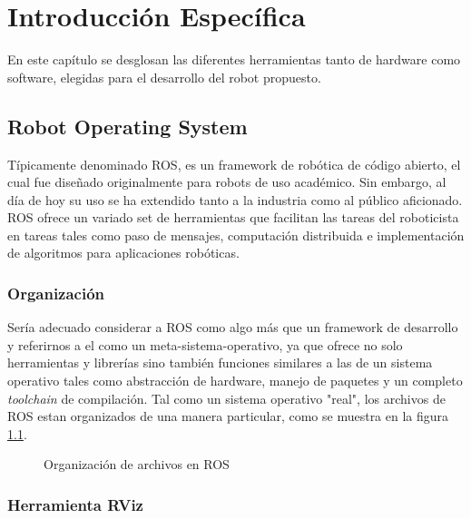 \chapter{Introducción Específica}

\label{Capitulo2}

En este capítulo se desglosan las diferentes herramientas tanto de hardware como software, elegidas para el desarrollo del robot propuesto.

\section{Robot Operating System}

Típicamente denominado ROS, es un framework de robótica de código abierto, el cual fue diseñado originalmente para robots de uso académico. Sin embargo, al día de hoy su uso se ha extendido tanto a la industria como al público aficionado.\newline
ROS ofrece un variado set de herramientas que facilitan las tareas del roboticista en tareas tales como paso de mensajes, computación distribuida e implementación de algoritmos para aplicaciones robóticas.

\subsection{Organización}

Sería adecuado considerar a ROS como algo más que un framework de desarrollo y referirnos a el como un meta-sistema-operativo, ya que ofrece no solo herramientas y librerías sino también funciones similares a las de un sistema operativo tales como abstracción de hardware, manejo de paquetes y un completo \textit{toolchain} de compilación. Tal como un sistema operativo "real", los archivos de ROS estan organizados de una manera particular, como se muestra en la figura \ref{fig:rosSistemaDeArchivos}.

\begin{figure}[ht]
    \centering
    \def\svgwidth{300pt}
    
    \caption{Organización de archivos en ROS}
    \label{fig:rosSistemaDeArchivos}
\end{figure}


\subsection{Herramienta RViz}

